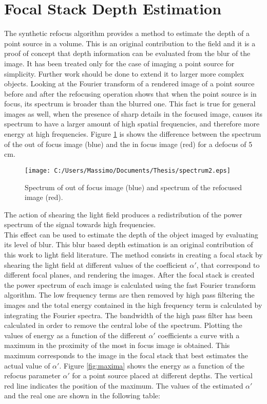 \section{Focal Stack Depth Estimation} 
The synthetic refocus algorithm provides a method to estimate the depth of a point source in a volume. This is an original contribution to the field and it is a proof of concept that depth information can be evaluated from the blur of the image. It has been treated only for the case of imaging a point source for simplicity. Further work should be done to extend it to larger more complex objects. Looking at the Fourier transform of a rendered image of a point source before and after the refocusing operation shows that when the point source is in focus, its spectrum is broader than the blurred one. This fact is true for general images as well, when the presence of sharp details in the focused image, causes its spectrum to have a larger amount of high spatial frequencies, and therefore more energy at high frequencies. Figure \ref{fig:spec1} is shows the difference between the spectrum of the out of focus image (blue) and the in focus image (red) for a defocus of 5 cm.
\begin{figure}[H]
	\centering
	\texttt{[image: C:/Users/Massimo/Documents/Thesis/spectrum2.eps]}
	\caption{\label{fig:spec1} Spectrum of out of focus image (blue) and spectrum of the refocused image (red). }
\end{figure}
The action of shearing the light field produces a redistribution of the power spectrum of the signal towards high frequencies. \\
 This effect can be used to estimate the depth of the object imaged by evaluating its level of blur. This blur based depth estimation is an original contribution of this work to light field literature. The method consists in creating a focal stack by shearing the light field at different values of the coefficient $ \alpha'$, that correspond to different focal planes, and rendering the images. After the focal stack is created the power spectrum of each image is calculated using the fast Fourier transform algorithm. The low frequency terms are then removed by high pass filtering the images and the total energy contained in the high frequency term is calculated by integrating the Fourier spectra. The bandwidth of the high pass filter has been calculated in order to remove the central lobe of the spectrum. Plotting the values of energy as a function of the different $ \alpha'$ coefficients a curve with a maximum in the proximity of the most in focus image is obtained. This maximum corresponds to the image in the focal stack that best estimates the actual value of $ \alpha'$. Figure \ref{fig:maxima} shows the energy as a function of the refocus parameter $ \alpha'$ for a point source placed at different depths. The vertical red line indicates the position of the maximum. The values of the estimated $ \alpha'$ and the real one are shown in the following table:
